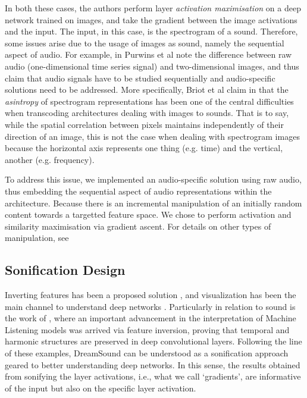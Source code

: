 \documentclass[a4paper,10pt,oneside]{article}
\begin{document}
\begin{sloppy}
In both these cases, the authors perform layer \textit{activation maximisation} on a deep network trained on images, and take the gradient between the image activations and the input. The input, in this case, is the spectrogram of a sound. Therefore, some issues arise due to the usage of images as sound, namely the sequential aspect of audio. For example, in \cite{2019Purwins} Purwins et al note the difference between raw audio (one-dimensional time series signal) and two-dimensional images, and thus claim that audio signals have to be studied sequentially and audio-specific solutions need to be addressed. More specifically, Briot et al claim in \cite{Briot2017}that the \textit{asintropy} of spectrogram representations has been one of the central difficulties when transcoding architectures dealing with images to sounds. That is to say, while the spatial correlation between pixels maintains independently of their direction of an image, this is not the case when dealing with spectrogram images because the horizontal axis represents one thing (e.g. time) and the vertical, another (e.g. frequency). 

To address this issue, we implemented an audio-specific solution using raw audio, thus embedding the sequential aspect of audio representations within the architecture. Because there is an incremental manipulation of an initially random content towards a targetted feature space. We chose to perform activation and similarity maximisation via gradient ascent. For details on other types of manipulation, see \cite{Briot2017}

\subsection{Sonification Design}
Inverting features has been a proposed solution \cite{mahendran2014understanding, dosovitskiy2016inverting}, and visualization has been the main channel to understand deep networks \cite{simonyan2014deep}. Particularly in relation to sound is the work of \cite{saumitra_mishra_2018_1492527}, where an important advancement in the interpretation of Machine Listening models was arrived via feature inversion, proving that temporal and harmonic structures are preserved in deep convolutional layers. Following the line of these examples, DreamSound can be understood as a sonification approach geared to better understanding deep networks. In this sense, the results obtained from sonifying the layer activations, i.e., what we call `gradients', are informative of the input but also on the specific layer activation. 


\end{sloppy}
\end{document}
